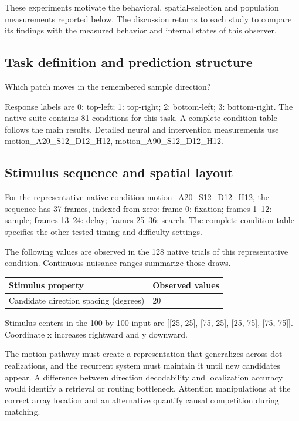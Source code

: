 \documentclass[11pt]{article}
\begin{document}
These experiments motivate the behavioral, spatial-selection and population measurements reported below. The discussion returns to each study to compare its findings with the measured behavior and internal states of this observer.
\subsection{Task definition and prediction structure}
Which patch moves in the remembered sample direction?

Response labels are 0: top-left; 1: top-right; 2: bottom-left; 3: bottom-right. The native suite contains 81 conditions for this task. A complete condition table follows the main results. Detailed neural and intervention measurements use motion\_\allowbreak{}A20\_\allowbreak{}S12\_\allowbreak{}D12\_\allowbreak{}H12, motion\_\allowbreak{}A90\_\allowbreak{}S12\_\allowbreak{}D12\_\allowbreak{}H12.

\subsection{Stimulus sequence and spatial layout}
For the representative native condition motion\_\allowbreak{}A20\_\allowbreak{}S12\_\allowbreak{}D12\_\allowbreak{}H12, the sequence has 37 frames, indexed from zero: frame 0: fixation; frames 1--12: sample; frames 13--24: delay; frames 25--36: search. The complete condition table specifies the other tested timing and difficulty settings.

The following values are observed in the 128 native trials of this representative condition. Continuous nuisance ranges summarize those draws.
\begin{center}\small\begin{tabular}{p{}p{}}\toprule Stimulus property & Observed values\\\midrule
Candidate direction spacing (degrees) & 20\\
\bottomrule\end{tabular}\normalsize\end{center}
Stimulus centers in the 100 by 100 input are [[25, 25], [75, 25], [25, 75], [75, 75]]. Coordinate x increases rightward and y downward.

The motion pathway must create a representation that generalizes across dot realizations, and the recurrent system must maintain it until new candidates appear. A difference between direction decodability and localization accuracy would identify a retrieval or routing bottleneck. Attention manipulations at the correct array location and an alternative quantify causal competition during matching.
\end{document}
